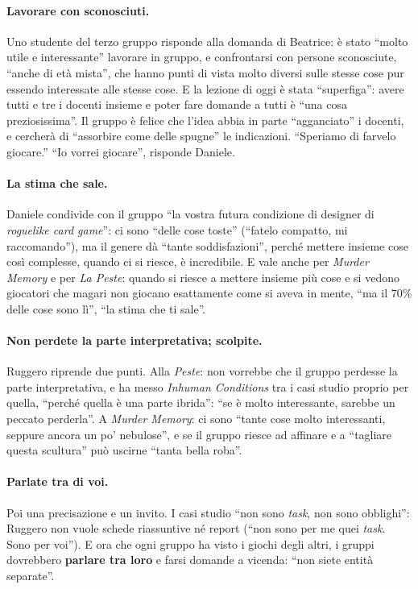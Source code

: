 \paragraph{Lavorare con sconosciuti.} Uno studente del terzo gruppo risponde alla domanda
di Beatrice: è stato ``molto utile e interessante'' lavorare in gruppo, e confrontarsi con
persone sconosciute, ``anche di età mista'', che hanno punti di vista molto diversi sulle
stesse cose pur essendo interessate alle stesse cose. E la lezione di oggi è stata
``superfiga'': avere tutti e tre i docenti insieme e poter fare domande a tutti è ``una
cosa preziosissima''. Il gruppo è felice che l'idea abbia in parte ``agganciato'' i
docenti, e cercherà di ``assorbire come delle spugne'' le indicazioni. ``Speriamo di
farvelo giocare.'' ``Io vorrei giocare'', risponde Daniele.

\paragraph{La stima che sale.} Daniele condivide con il gruppo ``la vostra futura
condizione di designer di \emph{roguelike card game}'': ci sono ``delle cose toste''
(``fatelo compatto, mi raccomando''), ma il genere dà ``tante soddisfazioni'', perché
mettere insieme cose così complesse, quando ci si riesce, è incredibile. E vale anche per
\emph{Murder Memory} e per \emph{La Peste}: quando si riesce a mettere insieme più cose e si
vedono giocatori che magari non giocano esattamente come si aveva in mente, ``ma il 70\%
delle cose sono lì'', ``la stima che ti sale''.

\paragraph{Non perdete la parte interpretativa; scolpite.} Ruggero riprende due punti. Alla
\emph{Peste}: non vorrebbe che il gruppo perdesse la parte interpretativa, e ha messo
\emph{Inhuman Conditions} tra i casi studio proprio per quella, ``perché quella è una
parte ibrida'': ``se è molto interessante, sarebbe un peccato perderla''. A \emph{Murder
Memory}: ci sono ``tante cose molto interessanti, seppure ancora un po' nebulose'', e se il
gruppo riesce ad affinare e a ``tagliare questa scultura'' può uscirne ``tanta bella
roba''.

\paragraph{Parlate tra di voi.} Poi una precisazione e un invito. I casi studio ``non sono
\emph{task}, non sono obblighi'': Ruggero non vuole schede riassuntive né report (``non
sono per me quei \emph{task}. Sono per voi''). E ora che ogni gruppo ha visto i giochi
degli altri, i gruppi dovrebbero \textbf{parlare tra loro} e farsi domande a vicenda:
``non siete entità separate''.

